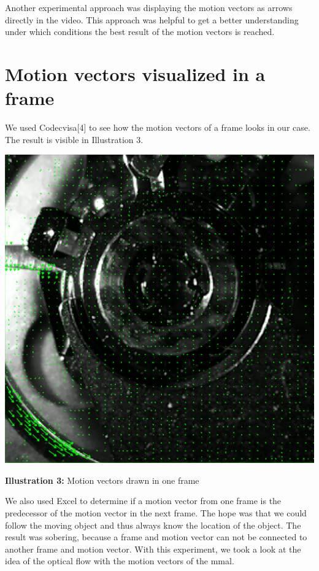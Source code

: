 \documentclass[12pt, a4paper]{report}
\begin{document}
\bigskip

Another experimental approach was displaying the motion vectors as arrows directly in the video. This approach was helpful to get a better understanding under which conditions the best result of the motion vectors is reached.
\pagebreak

\section{Motion vectors visualized in a frame}
We used Codecvisa[4] to see how the motion vectors of a frame looks in our case.
The result is visible in Illustration 3.
\bigskip
\noindent
\begin{center}
\includegraphics[scale=0.4]{Images/motion_vectors.png}

{\bf Illustration 3:}  Motion vectors drawn in one frame
\end{center}
\bigskip

We also used Excel to determine if a motion vector from one frame is the predecessor of the motion vector in the next frame.
The hope was that we could follow the moving object and thus always know the location of the object.
The result was sobering, because a frame and motion vector can not be connected to another frame and motion vector.
With this experiment, we took a look at the idea of the optical flow with the motion vectors of the mmal.
\end{document}
